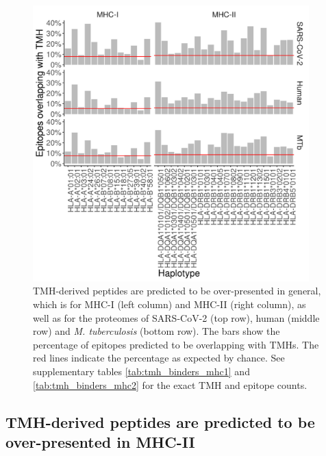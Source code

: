 \begin{figure}[!htbp]
  \centering
  \includegraphics[width=0.95\textwidth]{bbbq_1_smart_results/fig_f_tmh_2_panel}
  \caption{
    TMH-derived peptides are predicted to be over-presented in general,
    which is for MHC-I (left column) and MHC-II (right column),
    as well as for the proteomes of SARS-CoV-2 (top row), human (middle 
    row) and \emph{M. tuberculosis} (bottom row).
    The bars show the percentage of epitopes predicted to be 
    overlapping with TMHs.
    The red lines indicate the percentage as expected by chance.
    See supplementary tables \ref{tab:tmh_binders_mhc1} and \ref{tab:tmh_binders_mhc2}
    for the exact TMH and  epitope counts.
  }
  \label{fig:bbbq_1_smart_results}
\end{figure}

\subsection{TMH-derived peptides are predicted to be over-presented in MHC-II}

